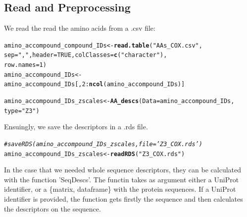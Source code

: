 \documentclass[twoside,a4wide,12pt]{article}\usepackage[]{graphicx}\usepackage[]{color}
\makeatletter
\newcommand{\hlnum}[1]{\textcolor[rgb]{0.686,0.059,0.569}{#1}}%
\newcommand{\hlstr}[1]{\textcolor[rgb]{0.192,0.494,0.8}{#1}}%
\newcommand{\hlcom}[1]{\textcolor[rgb]{0.678,0.584,0.686}{\textit{#1}}}%
\newcommand{\hlopt}[1]{\textcolor[rgb]{0,0,0}{#1}}%
\newcommand{\hlstd}[1]{\textcolor[rgb]{0.345,0.345,0.345}{#1}}%
\newcommand{\hlkwb}[1]{\textcolor[rgb]{0.69,0.353,0.396}{#1}}%
\newcommand{\hlkwc}[1]{\textcolor[rgb]{0.333,0.667,0.333}{#1}}%
\newcommand{\hlkwd}[1]{\textcolor[rgb]{0.737,0.353,0.396}{\textbf{#1}}}%
\newenvironment{kframe}{%
 \def\at@end@of@kframe{}%
 \ifinner\ifhmode%
  \def\at@end@of@kframe{\end{minipage}}%
  \begin{minipage}{\columnwidth}%
 \fi\fi%
 \def\FrameCommand##1{\hskip\@totalleftmargin \hskip-\fboxsep
 \colorbox{shadecolor}{##1}\hskip-\fboxsep
     \hskip-\linewidth \hskip-\@totalleftmargin \hskip\columnwidth}%
 \MakeFramed {\advance\hsize-\width
   \@totalleftmargin\z@ \linewidth\hsize
   \@setminipage}}%
 {\par\unskip\endMakeFramed%
 \at@end@of@kframe}
\newenvironment{knitrout}{}{} %
\makeatother
\begin{document}
\subsection{Read and Preprocessing}
We read the read the amino acids from a .csv file:
\begin{knitrout}
\color{fgcolor}\begin{kframe}
\begin{alltt}
\hlstd{amino_accompound_compound_IDs} \hlkwb{<-} \hlkwd{read.table}\hlstd{(}\hlstr{"AAs_COX.csv"}\hlstd{,}
    \hlkwc{sep} \hlstd{=} \hlstr{","}\hlstd{,} \hlkwc{header} \hlstd{=} \hlnum{TRUE}\hlstd{,} \hlkwc{colClasses} \hlstd{=} \hlkwd{c}\hlstd{(}\hlstr{"character"}\hlstd{),}
    \hlkwc{row.names} \hlstd{=} \hlnum{1}\hlstd{)}
\hlstd{amino_accompound_IDs} \hlkwb{<-} \hlstd{amino_accompound_IDs[,} \hlnum{2}\hlopt{:}\hlkwd{ncol}\hlstd{(amino_accompound_IDs)]}
\end{alltt}
\end{kframe}
\end{knitrout}


\begin{knitrout}
\color{fgcolor}\begin{kframe}
\begin{alltt}
\hlstd{amino_accompound_IDs_zscales} \hlkwb{<-} \hlkwd{AA_descs}\hlstd{(}\hlkwc{Data} \hlstd{= amino_accompound_IDs,}
    \hlkwc{type} \hlstd{=} \hlstr{"Z3"}\hlstd{)}
\end{alltt}
\end{kframe}
\end{knitrout}


Ensuingly, we save the descriptors in a .rds file.
\begin{knitrout}
\color{fgcolor}\begin{kframe}
\begin{alltt}
\hlcom{# saveRDS(amino_accompound_IDs_zscales,file='Z3_COX.rds')}
\hlstd{amino_accompound_IDs_zscales} \hlkwb{<-} \hlkwd{readRDS}\hlstd{(}\hlstr{"Z3_COX.rds"}\hlstd{)}
\end{alltt}
\end{kframe}
\end{knitrout}


In the case that we needed whole sequence descriptors, they can be calculated with the function 'SeqDescs'. The functin takes as argument either a UniProt identifier, or a \{matrix, dataframe\} with the protein sequences. If a UniProt identifier is provided, the function gets firstly the sequence and then calculates the descriptors on the sequence.
\end{document}
